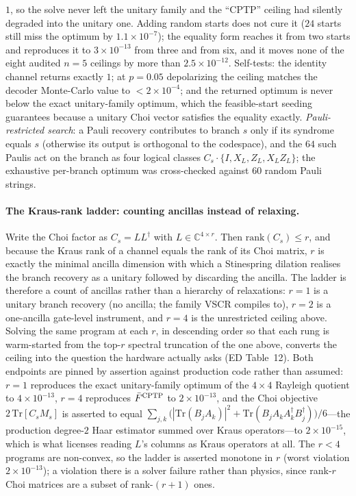 \documentclass[aps,prxquantum,reprint,superscriptaddress]{revtex4-2}
\newcommand{\tr}{\mathrm{Tr}}
\begin{document}
$1$, so the solve never left the unitary family and the ``CPTP'' ceiling had
silently degraded into the unitary one. Adding random starts does not cure it
($24$ starts still miss the optimum by $1.1\times10^{-7}$); the equality form
reaches it from two starts and reproduces it to $3\times10^{-13}$ from three and
from six, and it moves none of the eight audited $n=5$ ceilings by more than
$2.5\times10^{-12}$. Self-tests: the identity channel returns exactly $1$; at
$p=0.05$ depolarizing the ceiling matches the decoder Monte-Carlo value to
$<2\times10^{-4}$; and the returned optimum is never below the exact
unitary-family optimum, which the feasible-start seeding guarantees because a
unitary Choi vector satisfies the equality exactly. \emph{Pauli-restricted
search}: a Pauli recovery contributes to branch $s$ only if its syndrome
equals $s$ (otherwise its output is orthogonal to the codespace), and the
$64$ such Paulis act on the branch as four logical classes
$C_s\cdot\{I,X_L,Z_L,X_LZ_L\}$; the exhaustive per-branch optimum was
cross-checked against $60$ random Pauli strings.

\paragraph{The Kraus-rank ladder: counting ancillas instead of relaxing.}
Write the Choi factor as $C_s=LL^\dagger$ with $L\in\mathbb C^{4\times r}$. Then
$\mathrm{rank}(C_s)\le r$, and because the Kraus rank of a channel equals the rank
of its Choi matrix, $r$ is exactly the minimal ancilla dimension with which a
Stinespring dilation realises the branch recovery as a unitary followed by
discarding the ancilla. The ladder is therefore a count of ancillas rather than a
hierarchy of relaxations: $r{=}1$ is a unitary branch recovery (no ancilla; the
family VSCR compiles to), $r{=}2$ is a one-ancilla gate-level instrument, and
$r{=}4$ is the unrestricted ceiling above. Solving the same program at each $r$,
in descending order so that each rung is warm-started from the top-$r$ spectral
truncation of the one above, converts the ceiling into the question the hardware
actually asks (ED Table~12). Both endpoints are pinned by assertion against
production code rather than assumed: $r{=}1$ reproduces the exact unitary-family
optimum of the $4\times4$ Rayleigh quotient to $4\times10^{-13}$, $r{=}4$
reproduces $\bar F^{\rm CPTP}$ to $2\times10^{-13}$, and the Choi objective
$2\,\mathrm{Tr}[C_sM_s]$ is asserted to equal
$\sum_{j,k}\big(|\tr(B_jA_k)|^2+\tr(B_jA_kA_k^\dagger B_j^\dagger)\big)/6$---the
production degree-$2$ Haar estimator summed over Kraus operators---to
$2\times10^{-15}$, which is what licenses reading $L$'s columns as Kraus
operators at all. The $r<4$ programs are non-convex, so the ladder is asserted
monotone in $r$ (worst violation $2\times10^{-13}$); a violation there is a solver
failure rather than physics, since rank-$r$ Choi matrices are a subset of
rank-$(r{+}1)$ ones.
\end{document}
